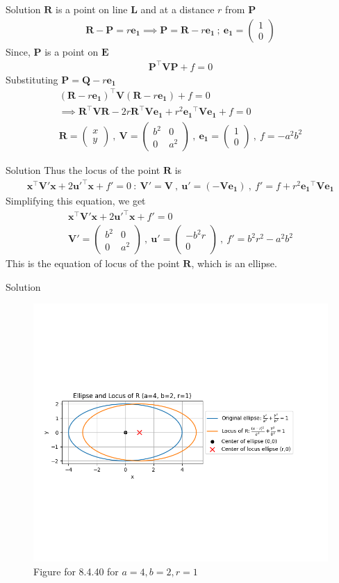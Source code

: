 \documentclass{beamer}
\let\vec\mathbf
\providecommand{\brak}[1]{\ensuremath{\left(#1\right)}}
\theoremstyle{remark}
\newcommand{\myvec}[1]{\ensuremath{\begin{pmatrix}#1\end{pmatrix}}}
\begin{document}
\begin{frame}{Solution}
$\vec{R}$ is a point on line $\vec{L}$ and at a distance $r$ from $\vec{P}$
\begin{align}
    \vec{R} - \vec{P}= r\vec{e_1} \implies \vec{P}=\vec{R} - r\vec{e_1}\  ; \ \vec{e_1}=\myvec{1\\0}
\end{align}
Since, $\vec{P}$ is a point on $\vec{E}$
\begin{align}
    \vec{P}^{\top}\vec{V}\vec{P} + f=0
\end{align}
Substituting $\vec{P} = \vec{Q} -r\vec{e_1}$
\begin{align}
    \brak{\vec{R} -r\vec{e_1}}^{\top}\vec{V}\brak{\vec{R} -r\vec{e_1}} + f=0 \\\implies \vec{R}^{\top}\vec{V}\vec{R} - 2r\vec{R}^{\top}\vec{V}\vec{e_1} + r^2\vec{e_1}^{\top}\vec{V}\vec{e_1}+f=0\\
    \vec{R}= \myvec{x\\y} \ , \ \vec{V}=\myvec{b^2 & 0 \\ 0 & a^2} \ , \ \vec{e_1}=\myvec{1\\0} \ , \ f=-a^2b^2
\end{align}
\end{frame}

\begin{frame}{Solution}
Thus the locus of the point $\vec{R}$ is
\begin{align}
    \vec{x}^{\top}\vec{V'}\vec{x} + 2 \vec{u'}^{\top}\vec{x} + f'=0 \ : \ \vec{V'}=\vec{V} \ , \ \vec{u'}=\brak{-\vec{V}\vec{e_1}} \ , \ f'=f+ r^2\vec{e_1}^{\top}\vec{V}\vec{e_1}
\end{align}
Simplifying this equation, we get
\begin{align}
 	\vec{x}^{\top}\vec{V'}\vec{x} + 2\vec{u'}^{\top}\vec{x} +f'=0 \\ \vec{V'}=\myvec{b^2 & 0\\0&a^2} \ , \ \vec{u'}=\myvec{-b^2r\\0} \ , \  f'=b^2r^2 - a^2b^2
\end{align}
This is the equation of locus of the point $\vec{R}$, which is an ellipse.
\end{frame}
\begin{frame}{Solution}
    \begin{figure}[H]
        \centering
        \includegraphics[width=0.5\columnwidth]{figs/1.png}
        \caption{Figure for 8.4.40 for $a=4, b=2, r=1$}
        \label{fig:placeholder}
    \end{figure}
\end{frame}
\end{document}
